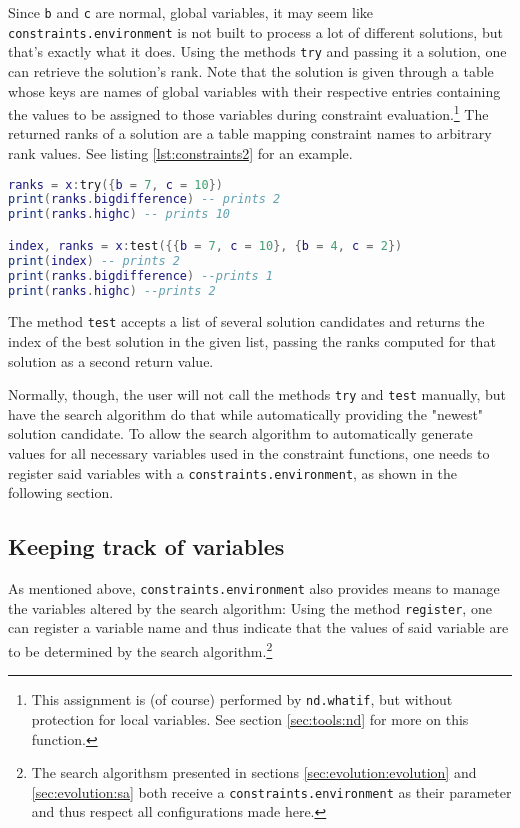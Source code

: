 Since \texttt{b} and \texttt{c} are normal, global variables, it may seem like \texttt{constraints.environment} is not built to process a lot of different solutions, but that's exactly what it does. Using the methods \texttt{try} and passing it a solution, one can retrieve the solution's rank. Note that the solution is given through a table whose keys are names of global variables with their respective entries containing the values to be assigned to those variables during constraint evaluation.\footnote{This assignment is (of course) performed by \texttt{nd.whatif}, but without protection for local variables. See section \ref{sec:tools:nd} for more on this function.} The returned ranks of a solution are a table mapping constraint names to arbitrary rank values. See listing \ref{lst:constraints2} for an example.

\begin{lstlisting}[language=lua, caption={Example usage of the method \texttt{try} (continued from listing \ref{lst:constraints1})}, label=lst:constraints2, name=lst:constraints]
ranks = x:try({b = 7, c = 10}) 
print(ranks.bigdifference) -- prints 2
print(ranks.highc) -- prints 10

index, ranks = x:test({{b = 7, c = 10}, {b = 4, c = 2})
print(index) -- prints 2
print(ranks.bigdifference) --prints 1
print(ranks.highc) --prints 2
\end{lstlisting}

The method \texttt{test} accepts a list of several solution candidates and returns the index of the best solution in the given list, passing the ranks computed for that solution as a second return value.

Normally, though, the user will not call the methods \texttt{try} and \texttt{test} manually, but have the search algorithm do that while automatically providing the "newest" solution candidate. To allow the search algorithm to automatically generate values for all necessary variables used in the constraint functions, one needs to register said variables with a \texttt{constraints.environment}, as shown in the following section.


\subsection{Keeping track of variables}
\label{sec:evolution:constraints:vars}

As mentioned above, \texttt{constraints.environment} also provides means to manage the variables altered by the search algorithm: Using the method \texttt{register}, one can register a variable name and thus indicate that the values of said variable are to be determined by the search algorithm.\footnote{The search algorithsm presented in sections \ref{sec:evolution:evolution} and \ref{sec:evolution:sa} both receive a \texttt{constraints.environment} as their parameter and thus respect all configurations made here.}

